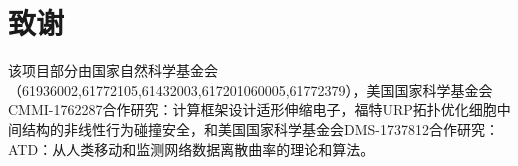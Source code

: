 
\section*{致谢}

该项目部分由国家自然科学基金会（61936002,61772105,61432003,617201060005,61772379），美国国家科学基金会CMMI-1762287合作研究：计算框架设计适形伸缩电子，福特URP拓扑优化细胞中间结构的非线性行为碰撞安全，和美国国家科学基金会DMS-1737812合作研究：ATD：从人类移动和监测网络数据离散曲率的理论和算法。